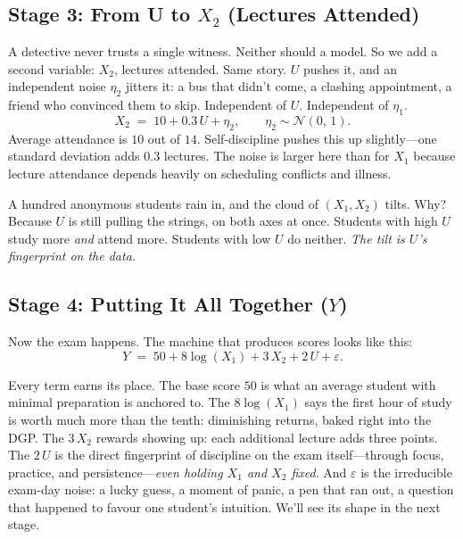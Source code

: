 \documentclass[11pt,a4paper]{article}
\theoremstyle{definition}
\theoremstyle{plain}
\theoremstyle{remark}
\begin{document}
\subsection{Stage 3: From U to $X_2$ (Lectures Attended)}\label{subsec:stage-X2}

A detective never trusts a single witness. Neither should a model. So we add a second variable: $X_2$, lectures attended. Same story. $U$ pushes it, and an independent noise $\eta_2$ jitters it: a bus that didn't come, a clashing appointment, a friend who convinced them to skip. Independent of $U$. Independent of $\eta_1$.
\begin{equation}\label{eq:X2}
  X_2 \;=\; 10 + 0.3\,U + \eta_2, \qquad \eta_2 \sim \mathcal{N}(0,\, 1).
\end{equation}
Average attendance is $10$ out of $14$. Self-discipline pushes this up slightly---one standard deviation adds $0.3$ lectures. The noise is larger here than for $X_1$ because lecture attendance depends heavily on scheduling conflicts and illness.

A hundred anonymous students rain in, and the cloud of $(X_1, X_2)$ tilts. Why? Because $U$ is still pulling the strings, on both axes at once. Students with high $U$ study more \emph{and} attend more. Students with low $U$ do neither. \emph{The tilt is $U$'s fingerprint on the data.}

\subsection{Stage 4: Putting It All Together ($Y$)}\label{subsec:stage-Y}

Now the exam happens. The machine that produces scores looks like this:
\begin{equation}\label{eq:Y}
  Y \;=\; 50 + 8\log(X_1) + 3\,X_2 + 2\,U + \varepsilon.
\end{equation}

Every term earns its place. The base score $50$ is what an average student with minimal preparation is anchored to. The $8\log(X_1)$ says the first hour of study is worth much more than the tenth: diminishing returns, baked right into the DGP. The $3\,X_2$ rewards showing up: each additional lecture adds three points. The $2\,U$ is the direct fingerprint of discipline on the exam itself---through focus, practice, and persistence---\emph{even holding $X_1$ and $X_2$ fixed}. And $\varepsilon$ is the irreducible exam-day noise: a lucky guess, a moment of panic, a pen that ran out, a question that happened to favour one student's intuition. We'll see its shape in the next stage.
\end{document}
